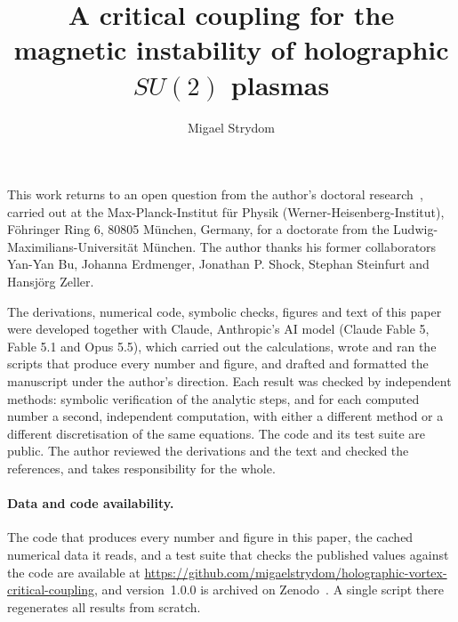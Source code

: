 \documentclass[a4paper,11pt]{article}
\title{A critical coupling for the magnetic instability of holographic $SU(2)$ plasmas}
\author{Migael Strydom}
\affiliation{Independent researcher, Cambridge, United Kingdom}
\newcommand{\coderepo}{\url{https://github.com/migaelstrydom/holographic-vortex-critical-coupling}}
\begin{document}
\maketitle








\acknowledgments

This work returns to an open question from the author's doctoral
research~\cite{Strydom:2014mfo},
carried out at the Max-Planck-Institut f\"ur Physik (Werner-Heisenberg-Institut),
F\"ohringer Ring 6, 80805 M\"unchen, Germany, for a doctorate from the
Ludwig-Maximilians-Universit\"at M\"unchen. The author thanks his former
collaborators Yan-Yan Bu, Johanna Erdmenger, Jonathan P. Shock, Stephan
Steinfurt and Hansj\"org Zeller.

The derivations, numerical code, symbolic checks, figures and text of this
paper were developed together with Claude, Anthropic's AI model (Claude
Fable 5, Fable 5.1 and Opus 5.5), which carried out the calculations, wrote
and ran the scripts that produce every number and figure, and drafted and
formatted the manuscript under the author's direction. Each result was
checked by independent methods: symbolic verification of the analytic
steps, and for each computed number a second, independent computation,
with either a different method or a different discretisation of the same
equations. The code
and its test suite are public. The author reviewed the derivations and the
text and checked the references, and takes responsibility for the whole.

\paragraph{Data and code availability.} The code that produces every
number and figure in this paper, the cached numerical data it reads, and a
test suite that checks the published values against the code are available
at \coderepo, and version~1.0.0 is archived on
Zenodo~\cite{Strydom:2026zenodo}. A single script there regenerates all
results from scratch.

\appendix








\end{document}
